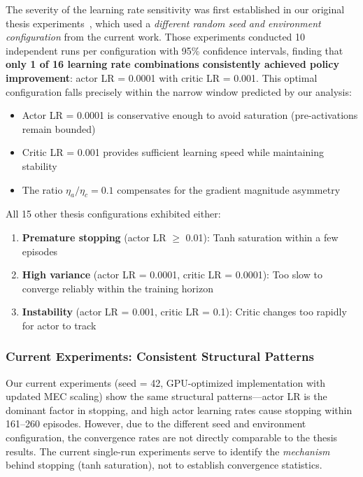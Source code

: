 The severity of the learning rate sensitivity was first established in our original thesis experiments~\cite{gebrekidan2024thesis}, which used a \textit{different random seed and environment configuration} from the current work. Those experiments conducted 10 independent runs per configuration with 95\% confidence intervals, finding that \textbf{only 1 of 16 learning rate combinations consistently achieved policy improvement}: actor LR = 0.0001 with critic LR = 0.001. This optimal configuration falls precisely within the narrow window predicted by our analysis:
\begin{itemize}
    \item Actor LR = 0.0001 is conservative enough to avoid saturation (pre-activations remain bounded)
    \item Critic LR = 0.001 provides sufficient learning speed while maintaining stability
    \item The ratio $\eta_a / \eta_c = 0.1$ compensates for the gradient magnitude asymmetry
\end{itemize}

All 15 other thesis configurations exhibited either:
\begin{enumerate}
    \item \textbf{Premature stopping} (actor LR $\geq$ 0.01): Tanh saturation within a few episodes
    \item \textbf{High variance} (actor LR = 0.0001, critic LR = 0.0001): Too slow to converge reliably within the training horizon
    \item \textbf{Instability} (actor LR = 0.001, critic LR = 0.1): Critic changes too rapidly for actor to track
\end{enumerate}

\subsubsection{Current Experiments: Consistent Structural Patterns}

Our current experiments (seed = 42, GPU-optimized implementation with updated MEC scaling) show the same structural patterns---actor LR is the dominant factor in stopping, and high actor learning rates cause stopping within 161--260 episodes. However, due to the different seed and environment configuration, the convergence rates are not directly comparable to the thesis results. The current single-run experiments serve to identify the \textit{mechanism} behind stopping (tanh saturation), not to establish convergence statistics.

